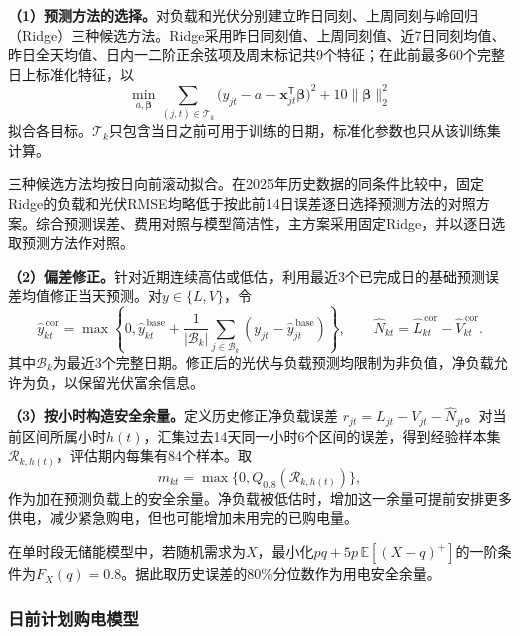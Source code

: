 \textbf{（1）预测方法的选择。}对负载和光伏分别建立昨日同刻、上周同刻与岭回归（Ridge）三种候选方法。Ridge采用昨日同刻值、上周同刻值、近7日同刻均值、昨日全天均值、日内一二阶正余弦项及周末标记共9个特征；在此前最多60个完整日上标准化特征，以
\begin{equation}
    \min_{a,\boldsymbol\beta}
    \sum_{(j,t)\in\mathcal T_k}
    \bigl(y_{jt}-a-\boldsymbol x_{jt}^{\mathsf T}\boldsymbol\beta\bigr)^2
    +10\|\boldsymbol\beta\|_2^2
    \label{eq:q2-ridge}
\end{equation}
拟合各目标。$\mathcal T_k$只包含当日之前可用于训练的日期，标准化参数也只从该训练集计算。

三种候选方法均按日向前滚动拟合。在2025年历史数据的同条件比较中，固定Ridge的负载和光伏RMSE均略低于按此前14日误差逐日选择预测方法的对照方案。综合预测误差、费用对照与模型简洁性，主方案采用固定Ridge，并以逐日选取预测方法作对照。

\textbf{（2）偏差修正。}针对近期连续高估或低估，利用最近3个已完成日的基础预测误差均值修正当天预测。对$y\in\{L,V\}$，令
\begin{equation}
    \widehat y_{kt}^{\,\mathrm{cor}}
    =\max\left\{0,\widehat y_{kt}^{\,\mathrm{base}}
      +\frac{1}{|\mathcal B_k|}\sum_{j\in\mathcal B_k}
       (y_{jt}-\widehat y_{jt}^{\,\mathrm{base}})\right\},
    \qquad \widehat N_{kt}=\widehat L_{kt}^{\,\mathrm{cor}}
                           -\widehat V_{kt}^{\,\mathrm{cor}}.
    \label{eq:q2-bias}
\end{equation}
其中$\mathcal B_k$为最近3个完整日期。修正后的光伏与负载预测均限制为非负值，净负载允许为负，以保留光伏富余信息。

\textbf{（3）按小时构造安全余量。}定义历史修正净负载误差
$r_{jt}=L_{jt}-V_{jt}-\widehat N_{jt}$。对当前区间所属小时$h(t)$，汇集过去14天同一小时6个区间的误差，得到经验样本集$\mathcal R_{k,h(t)}$，评估期内每集有84个样本。取
\begin{equation}
    m_{kt}=\max\{0,Q_{0.8}(\mathcal R_{k,h(t)})\},
    \label{eq:q2-margin}
\end{equation}
作为加在预测负载上的安全余量。净负载被低估时，增加这一余量可提前安排更多供电，减少紧急购电，但也可能增加未用完的已购电量。

在单时段无储能模型中，若随机需求为$X$，最小化$pq+5p\,\mathbb E[(X-q)^+]$的一阶条件为$F_X(q)=0.8$。据此取历史误差的80\%分位数作为用电安全余量。

\subsubsection{日前计划购电模型}

